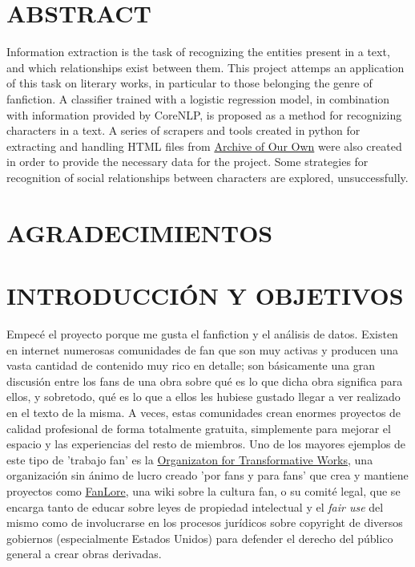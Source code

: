 \documentclass{pre-tfg}
\begin{document}
\section{ABSTRACT}
Information extraction is the task of recognizing the entities present in a text, and which relationships exist between them. This project attemps an application of this task on literary works, in particular to those belonging the genre of fanfiction. A classifier trained with a logistic regression model, in combination with information provided by CoreNLP, is proposed as a method for recognizing characters in a text. A series of scrapers and tools created in python for extracting and handling HTML files from \href{http://www.archiveofourown.org}{Archive of Our Own} were also created in order to provide the necessary data for the project. Some strategies for recognition of social relationships between characters are explored, unsuccessfully.

\cleardoublepage

\section{AGRADECIMIENTOS}


\cleardoublepage


\section{INTRODUCCIÓN Y OBJETIVOS}

Empecé el proyecto porque me gusta el fanfiction y el análisis de datos. Existen en internet numerosas comunidades de fan que son muy activas y producen una vasta cantidad de contenido muy rico en detalle; son básicamente una gran discusión entre los fans de una obra sobre qué es lo que dicha obra significa para ellos, y sobretodo, qué es lo que a ellos les hubiese gustado llegar a ver realizado en el texto de la misma. A veces, estas comunidades crean enormes proyectos de calidad profesional de forma totalmente gratuita, simplemente para mejorar el espacio y las experiencias del resto de miembros. Uno de los mayores ejemplos de este tipo de 'trabajo fan' es la \href{https://www.transformativeworks.org/}{Organizaton for Transformative Works}, una organización sin ánimo de lucro creado 'por fans y para fans' que crea y mantiene proyectos como \href{https://www.fanlore.org/wiki/Main_Page}{FanLore}, una wiki sobre la cultura fan, o su comité legal, que se encarga tanto de educar sobre leyes de propiedad intelectual y el \textit{fair use} del mismo como de involucrarse en los procesos jurídicos sobre copyright de diversos gobiernos (especialmente Estados Unidos) para defender el derecho del público general a crear obras derivadas.
\end{document}
